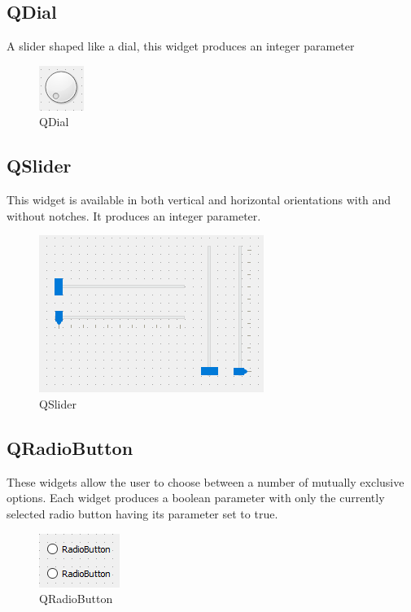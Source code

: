 \documentclass[a4paper,10pt]{book}
\begin{document}
\subsection{QDial}
A slider shaped like a dial, this widget produces an integer parameter

\begin {figure}[!ht]
 \centering
 \includegraphics[scale=1.0]{images/widget/qdial}
 \caption{QDial}
\end {figure}

\subsection{QSlider}

This widget is available in both vertical and horizontal orientations with and without notches. It produces an integer parameter.

\begin {figure}[!ht]
 \centering
 \includegraphics[scale=1.0]{images/widget/qslider}
 \caption{QSlider}
\end {figure}

\subsection{QRadioButton}

These widgets allow the user to choose between a number of mutually exclusive options. Each widget produces a boolean parameter with only the currently selected radio button having its parameter set to true.

\begin {figure}[!ht]
 \centering
 \includegraphics[scale=1.0]{images/widget/qradiobutton}
 \caption{QRadioButton}
\end {figure}
\end{document}
